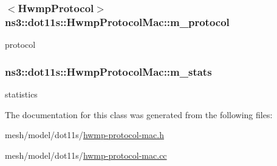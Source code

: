 \subsubsection[{\texorpdfstring{m\+\_\+protocol}{m_protocol}}]{$<${\bf Hwmp\+Protocol}$>$ ns3\+::dot11s\+::\+Hwmp\+Protocol\+Mac\+::m\+\_\+protocol\hspace{0.3cm}{\ttfamily [private]}}\hypertarget{classns3_1_1dot11s_1_1HwmpProtocolMac_a6a05e798e264c97e2b5c484a29270b7d}{}\label{classns3_1_1dot11s_1_1HwmpProtocolMac_a6a05e798e264c97e2b5c484a29270b7d}


protocol 

\subsubsection[{\texorpdfstring{m\+\_\+stats}{m_stats}}]{ ns3\+::dot11s\+::\+Hwmp\+Protocol\+Mac\+::m\+\_\+stats\hspace{0.3cm}{\ttfamily [private]}}\hypertarget{classns3_1_1dot11s_1_1HwmpProtocolMac_a72bb14d6985cc79bef9ac33fdcdb0a00}{}\label{classns3_1_1dot11s_1_1HwmpProtocolMac_a72bb14d6985cc79bef9ac33fdcdb0a00}


statistics 



The documentation for this class was generated from the following files\+:\begin{DoxyCompactItemize}
\item 
mesh/model/dot11s/\hyperlink{hwmp-protocol-mac_8h}{hwmp-\/protocol-\/mac.\+h}\item 
mesh/model/dot11s/\hyperlink{hwmp-protocol-mac_8cc}{hwmp-\/protocol-\/mac.\+cc}\end{DoxyCompactItemize}
